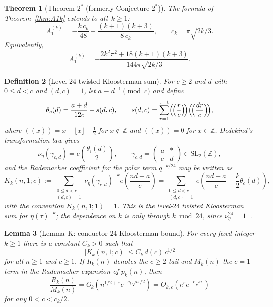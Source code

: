 \documentclass[11pt,a4paper]{article}
\newtheorem{theorem}{Theorem}[section]
\newtheorem{lemma}[theorem]{Lemma}
\newtheorem{definition}[theorem]{Definition}
\begin{document}
\begin{theorem}[Theorem $2^*$ (formerly Conjecture $2^*$)]\label{conj:2star}
The formula of Theorem~\ref{thm:A1k} extends to all~$k \geq 1$:
\[
  A_1^{(k)} = -\frac{k\,c_k}{48} - \frac{(k+1)(k+3)}{8\,c_k},
  \qquad c_k = \pi\sqrt{2k/3}.
\]
Equivalently,
\[
  A_1^{(k)} = -\frac{2k^2\pi^2 + 18(k+1)(k+3)}{144\pi\sqrt{2k/3}}.
\]
\end{theorem}

\begin{definition}[Level-$24$ twisted Kloosterman sum]\label{def:K24}
For $c\ge2$ and $d$ with $0\le d<c$ and $(d,c)=1$, let $a\equiv d^{-1}\pmod c$ and define
\[
  \theta_c(d)=\frac{a+d}{12c}-s(d,c),
  \qquad
  s(d,c)=\sum_{r=1}^{c-1}\Bigl(\!\Bigl(\frac{r}{c}\Bigr)\!\Bigr)\Bigl(\!\Bigl(\frac{dr}{c}\Bigr)\!\Bigr),
\]
where $((x))=x-\lfloor x\rfloor-\tfrac12$ for $x\notin\mathbb Z$ and $((x))=0$ for $x\in\mathbb Z$. Dedekind's transformation law gives
\[
  \nu_{\eta}(\gamma_{c,d})=e\!\left(\frac{\theta_c(d)}{2}\right),
  \qquad
  \gamma_{c,d}=\begin{pmatrix} a & *\\ c & d\end{pmatrix}\in \mathrm{SL}_2(\mathbb Z),
\]
and the Rademacher coefficient for the polar term $q^{-k/24}$ may be written as
\begin{equation}\label{eq:Kk-def}
  K_k(n,1;c)
  := \sum_{\substack{0\le d<c\\ (d,c)=1}}
     \nu_{\eta}(\gamma_{c,d})^{-k} e\!\left(\frac{nd+a}{c}\right)
  = \sum_{\substack{0\le d<c\\ (d,c)=1}}
     e\!\left(\frac{nd+a}{c}-\frac{k}{2}\theta_c(d)\right),
\end{equation}
with the convention $K_k(n,1;1)=1$. This is the level-$24$ twisted Kloosterman sum for $\eta(\tau)^{-k}$; the dependence on $k$ is only through $k\bmod 24$, since $\nu_{\eta}^{24}=1$~\cite{rademacher1937,apostol1990}.
\end{definition}

\begin{lemma}[Lemma~K: conductor-$24$ Kloosterman bound]\label{lem:K}
For every fixed integer $k\ge1$ there is a constant $C_k>0$ such that
\begin{equation}\label{eq:lemmaK-weil}
  |K_k(n,1;c)| \le C_k\,d(c)\,c^{1/2}
\end{equation}
for all $n\ge1$ and $c\ge1$. If $R_k(n)$ denotes the $c\ge2$ tail and $M_k(n)$ the $c=1$ term in the Rademacher expansion of $p_k(n)$, then
\begin{equation}\label{eq:lemmaK-tail}
  \frac{R_k(n)}{M_k(n)}=O_k\!\left(n^{1/2+\varepsilon}e^{-c_k\sqrt n/2}\right)
  = O_{k,\varepsilon}\!\left(n^{\varepsilon}e^{-c\sqrt n}\right)
\end{equation}
for any $0<c<c_k/2$.
\end{lemma}
\end{document}
